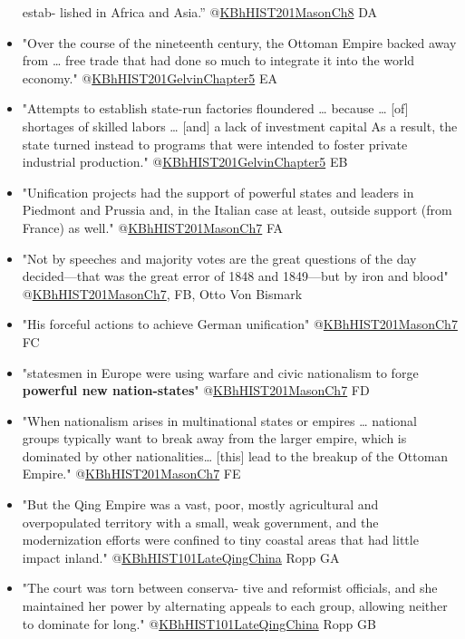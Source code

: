 \documentclass[letterpaper]{article}
\begin{document}
\begin{itemize}
estab- lished in Africa and Asia.”
@\href{KBhHIST201MasonCh8.org}{KBhHIST201MasonCh8} DA
\item "Over the course of the nineteenth century, the Ottoman Empire backed
away from \ldots{} free trade that had done so much to integrate it into
the world economy."
@\href{KBhHIST201GelvinChapter5.org}{KBhHIST201GelvinChapter5} EA
\item "Attempts to establish state-run factories floundered \ldots{} because \ldots{}
[of] shortages of skilled labors \ldots{} [and] a lack of investment
capital As a result, the state turned instead to programs that were
intended to foster private industrial production."
@\href{KBhHIST201GelvinChapter5.org}{KBhHIST201GelvinChapter5} EB
\item "Unification projects had the support of powerful states and leaders
in Piedmont and Prussia and, in the Italian case at least, outside
support (from France) as well."
@\href{KBhHIST201MasonCh7.org}{KBhHIST201MasonCh7} FA
\item "Not by speeches and majority votes are the great questions of the day
decided---that was the great error of 1848 and 1849---but by iron and
blood" @\href{KBhHIST201MasonCh7.org}{KBhHIST201MasonCh7}, FB, Otto
Von Bismark
\item "His forceful actions to achieve German unification"
@\href{KBhHIST201MasonCh7.org}{KBhHIST201MasonCh7} FC
\item "statesmen in Europe were using warfare and civic nationalism to forge
\textbf{powerful new nation-states}"
@\href{KBhHIST201MasonCh7.org}{KBhHIST201MasonCh7} FD
\item "When nationalism arises in multinational states or empires \ldots{}
national groups typically want to break away from the larger empire,
which is dominated by other nationalities\ldots{} [this] lead to the
breakup of the Ottoman Empire."
@\href{KBhHIST201MasonCh7.org}{KBhHIST201MasonCh7} FE
\item "But the Qing Empire was a vast, poor, mostly agricultural and
overpopulated territory with a small, weak government, and the
modernization efforts were confined to tiny coastal areas that had
little impact inland."
@\href{KBhHIST101LateQingChina.org}{KBhHIST101LateQingChina} Ropp GA
\item "The court was torn between conserva- tive and reformist officials,
and she maintained her power by alternating appeals to each group,
allowing neither to dominate for long."
@\href{KBhHIST101LateQingChina.org}{KBhHIST101LateQingChina} Ropp GB
\end{itemize}
\end{document}
